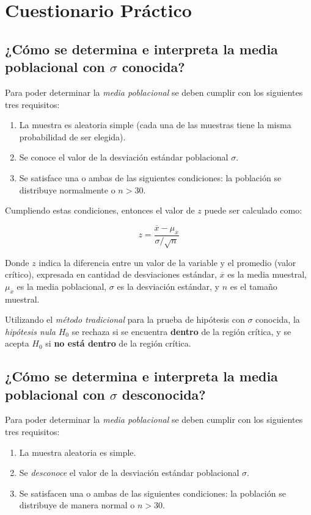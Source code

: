 \documentclass[a4paper, 12pt]{article}
\begin{document}
\section{Cuestionario Práctico}
\subsection{¿Cómo se determina e interpreta la media poblacional con \(\sigma\) conocida?}
Para poder determinar la \emph{media poblacional} se deben cumplir con los siguientes tres requisitos:

\begin{enumerate}
    \item La muestra es aleatoria simple (cada una de las muestras tiene la misma probabilidad de ser elegida).
    \item Se conoce el valor de la desviación estándar poblacional $\sigma$.
    \item Se satisface una o ambas de las siguientes condiciones: la población se distribuye normalmente o $n>30$.
\end{enumerate}

Cumpliendo estas condiciones, entonces el valor de $z$ puede ser calculado como:

\begin{equation}
    z=\frac{\overline{x}-\mu_{\overline{x}}}{\sigma/\sqrt{n}}
\end{equation}

Donde $z$ indica la diferencia entre un valor de la variable y el promedio (valor crítico), expresada en cantidad de desviaciones estándar, $\overline{x}$ es la media muestral, $\mu_{\overline{x}}$ es la media poblacional, $\sigma$ es la desviación estándar, y $n$ es el tamaño muestral.

Utilizando el \emph{método tradicional} para la prueba de hipótesis con $\sigma$ conocida, la \emph{hipótesis nula} $H_0$ se rechaza si se encuentra \textbf{dentro} de la región crítica, y se acepta $H_0$ si \textbf{no está dentro} de la región crítica.

\subsection{¿Cómo se determina e interpreta la media poblacional con $\sigma$ desconocida?}
Para poder determinar la \emph{media poblacional} se deben cumplir con los siguientes tres requisitos:

\begin{enumerate}
    \item La muestra aleatoria es simple.
    \item Se \emph{desconoce} el valor de la desviación estándar poblacional $\sigma$.
    \item Se satisfacen una o ambas de las siguientes condiciones: la población se distribuye de manera normal o $n>30$.
\end{enumerate}
\end{document}
